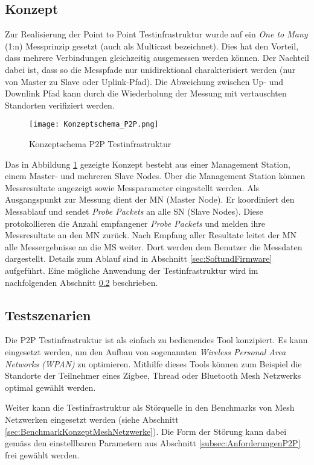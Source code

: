 \subsection{Konzept}\label{sec:KonzeptP2P}
Zur Realisierung der Point to Point Testinfrastruktur wurde auf ein \textit{One to Many} (1:n) Messprinzip gesetzt (auch als Multicast bezeichnet). Dies hat den Vorteil, dass mehrere Verbindungen gleichzeitig ausgemessen werden können. Der Nachteil dabei ist, dass so die Messpfade nur unidirektional charakterisiert werden (nur von Master zu Slave oder Uplink-Pfad). Die Abweichung zwischen Up- und Downlink Pfad kann durch die Wiederholung der Messung mit vertauschten Standorten verifiziert werden. 

\begin{figure} [H]
	\centering
	\texttt{[image: Konzeptschema\_P2P.png]}
	\caption{Konzeptschema P2P Testinfrastruktur}
	\label{fig:KonzeptschemaP2P}
\end{figure}

Das in Abbildung \ref{fig:KonzeptschemaP2P} gezeigte Konzept besteht aus einer Management Station, einem Master- und mehreren Slave Nodes.
Über die Management Station können Messresultate angezeigt sowie Messparameter eingestellt werden. Als Ausgangspunkt zur Messung dient der MN (Master Node).
Er koordiniert den Messablauf und sendet \textit{Probe Packets} an alle SN (Slave Nodes).
Diese protokollieren die Anzahl empfangener \textit{Probe Packets} und melden ihre Messresultate an den MN zurück.
Nach Empfang aller Resultate leitet der MN alle Messergebnisse an die MS weiter.
Dort werden dem Benutzer die Messdaten dargestellt.
Details zum Ablauf sind in Abschnitt \ref{sec:SoftundFirmware} aufgeführt.
Eine mögliche Anwendung der Testinfrastruktur wird im nachfolgenden Abschnitt \ref{sec:TestszenarienP2P} beschrieben.  

\subsection{Testszenarien}\label{sec:TestszenarienP2P}
Die P2P Testinfrastruktur ist als einfach zu bedienendes Tool konzipiert.
Es kann eingesetzt werden, um den Aufbau von sogenannten \textit{Wireless Personal Area Networks (WPAN)} zu optimieren.
Mithilfe dieses Tools können zum Beispiel die Standorte der Teilnehmer eines Zigbee, Thread oder Bluetooth Mesh Netzwerks optimal gewählt werden.

Weiter kann die Testinfrastruktur als Störquelle in den Benchmarks von Mesh Netzwerken eingesetzt werden (siehe Abschnitt \ref{sec:BenchmarkKonzeptMeshNetzwerke}).
Die Form der Störung kann dabei gemäss den einstellbaren Parametern aus Abschnitt \ref{subsec:AnforderungenP2P} frei gewählt werden.


